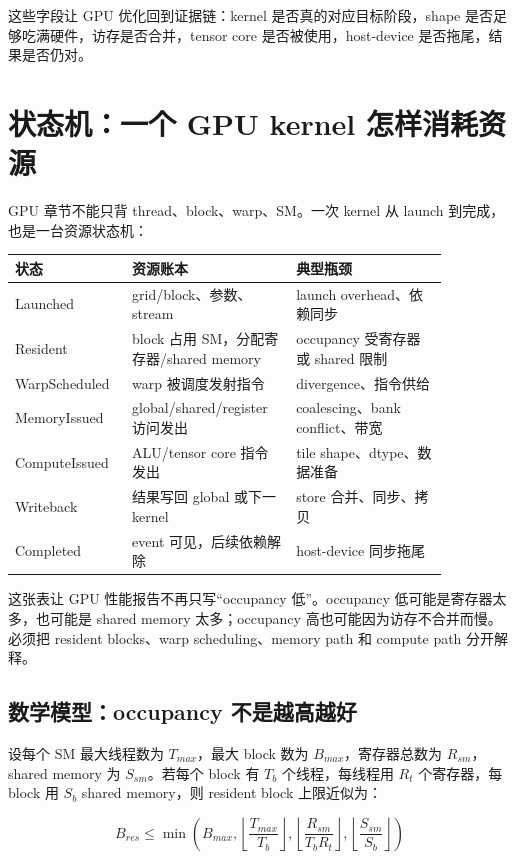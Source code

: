 这些字段让 GPU 优化回到证据链：kernel 是否真的对应目标阶段，shape 是否足够吃满硬件，访存是否合并，tensor core 是否被使用，host-device 是否拖尾，结果是否仍对。

\section{状态机：一个 GPU kernel 怎样消耗资源}

GPU 章节不能只背 thread、block、warp、SM。一次 kernel 从 launch 到完成，也是一台资源状态机：

\begin{center}
\begin{tabular}{p{0.20\linewidth}p{0.34\linewidth}p{0.32\linewidth}}
\toprule
状态 & 资源账本 & 典型瓶颈 \\
\midrule
Launched & grid/block、参数、stream & launch overhead、依赖同步 \\
Resident & block 占用 SM，分配寄存器/shared memory & occupancy 受寄存器或 shared 限制 \\
WarpScheduled & warp 被调度发射指令 & divergence、指令供给 \\
MemoryIssued & global/shared/register 访问发出 & coalescing、bank conflict、带宽 \\
ComputeIssued & ALU/tensor core 指令发出 & tile shape、dtype、数据准备 \\
Writeback & 结果写回 global 或下一 kernel & store 合并、同步、拷贝 \\
Completed & event 可见，后续依赖解除 & host-device 同步拖尾 \\
\bottomrule
\end{tabular}
\end{center}

这张表让 GPU 性能报告不再只写“occupancy 低”。occupancy 低可能是寄存器太多，也可能是 shared memory 太多；occupancy 高也可能因为访存不合并而慢。必须把 resident blocks、warp scheduling、memory path 和 compute path 分开解释。

\subsection{数学模型：occupancy 不是越高越好}

设每个 SM 最大线程数为 \(T_{max}\)，最大 block 数为 \(B_{max}\)，寄存器总数为 \(R_{sm}\)，shared memory 为 \(S_{sm}\)。若每个 block 有 \(T_b\) 个线程，每线程用 \(R_t\) 个寄存器，每 block 用 \(S_b\) shared memory，则 resident block 上限近似为：

\[
B_{res} \le \min\left(B_{max}, \left\lfloor\frac{T_{max}}{T_b}\right\rfloor,
\left\lfloor\frac{R_{sm}}{T_b R_t}\right\rfloor,
\left\lfloor\frac{S_{sm}}{S_b}\right\rfloor\right)
\]

